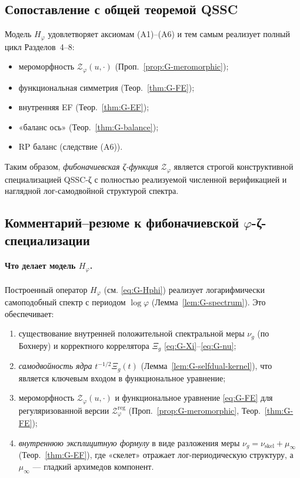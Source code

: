 \documentclass{article}
\numberwithin{equation}{section}
\theoremstyle{plain}
\theoremstyle{definition}
\theoremstyle{remark}
\def\infty{∞}\def\partial{∂}\def\sum{Σ}\def\int{∫}%
\def\cdot{·}\def\times{×}\def\pm{±}\def\mp{∓}\def\approx{≈}%
\begin{document}
\subsection*{Сопоставление с общей теоремой QSSC}

Модель \(H_\varphi\) удовлетворяет аксиомам (A1)–(A6) и тем самым реализует полный цикл Разделов~4–8:
\begin{itemize}
\item мероморфность \(\mathcal Z_\varphi(u,\cdot)\) (Проп.~\ref{prop:G-meromorphic});
\item функциональная симметрия (Теор.~\ref{thm:G-FE});
\item внутренняя EF (Теор.~\ref{thm:G-EF});
\item «баланс \iff ось» (Теор.~\ref{thm:G-balance});
\item RP \implies баланс (следствие (A6)).
\end{itemize}
Таким образом, \emph{фибоначиевская ζ-функция} \(\mathcal Z_\varphi\)
является строгой конструктивной специализацией QSSC-ζ с полностью реализуемой численной верификацией и наглядной лог-самодвойной структурой спектра.

\subsection*{Комментарий–резюме к фибоначиевской \texorpdfstring{$\varphi$}{φ}-ζ-специализации}

\paragraph{Что делает модель \(H_\varphi\).}
Построенный оператор \(H_\varphi\) (см. \eqref{eq:G-Hphi}) реализует логарифмически самоподобный спектр с периодом \(\log\varphi\) (Лемма~\ref{lem:G-spectrum}). Это обеспечивает:
\begin{enumerate}
\item существование внутренней положительной спектральной меры \(\nu_g\) (по Бохнеру) и корректного коррелятора \(\Xi_g\) \eqref{eq:G-Xi}–\eqref{eq:G-nu};
\item \emph{самодвойность ядра} \(t^{-1/2}\Xi_g(t)\) (Лемма~\ref{lem:G-selfdual-kernel}), что является ключевым входом в функциональное уравнение;
\item мероморфность \(\mathcal Z_\varphi(u,\cdot)\) и функциональное уравнение \eqref{eq:G-FE} для регуляризованной версии \(\mathcal Z_\varphi^{\mathrm{reg}}\) (Проп.~\ref{prop:G-meromorphic}, Теор.~\ref{thm:G-FE});
\item \emph{внутреннюю эксплицитную формулу} в виде разложения меры \(\nu_g=\nu_{\mathrm{skel}}+\mu_\infty\) (Теор.~\ref{thm:G-EF}), где «скелет» отражает лог-периодическую структуру, а \(\mu_\infty\) — гладкий архимедов компонент.
\end{enumerate}
\end{document}
